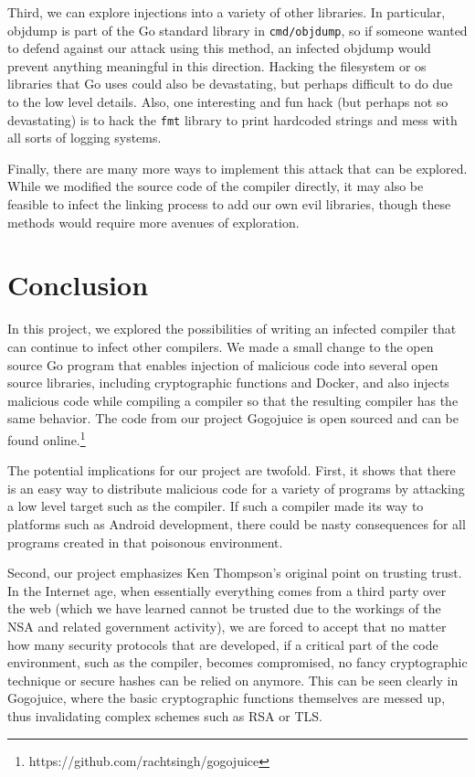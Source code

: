 \documentclass[10pt]{sigplanconf}
\begin{document}
\smallskip

Third, we can explore injections into a variety of other libraries. In particular, objdump is part of the Go standard library in \texttt{cmd/objdump}, so if someone wanted to defend against our attack using this method, an infected objdump would prevent anything meaningful in this direction. Hacking the filesystem or os libraries that Go uses could also be devastating, but perhaps difficult to do due to the low level details. Also, one interesting and fun hack (but perhaps not so devastating) is to hack the \texttt{fmt} library to print hardcoded strings and mess with all sorts of logging systems.

\smallskip

Finally, there are many more ways to implement this attack that can be explored. While we modified the source code of the compiler directly, it may also be feasible to infect the linking process to add our own evil libraries, though these methods would require more avenues of exploration.

\section{Conclusion}

In this project, we explored the possibilities of writing an infected compiler that can continue to infect other compilers. We made a small change to the open source Go program that enables injection of malicious code into several open source libraries, including cryptographic functions and Docker, and also injects malicious code while compiling a compiler so that the resulting compiler has the same behavior. The code from our project Gogojuice is open sourced and can be found online.\footnote{https://github.com/rachtsingh/gogojuice}

\smallskip

The potential implications for our project are twofold. First, it shows that there is an easy way to distribute malicious code for a variety of programs by attacking a low level target such as the compiler. If such a compiler made its way to platforms such as Android development, there could be nasty consequences for all programs created in that poisonous environment.

\smallskip
Second, our project emphasizes Ken Thompson's original point on trusting trust. In the Internet age, when essentially everything comes from a third party over the web (which we have learned cannot be trusted due to the workings of the NSA and related government activity), we are forced to accept that no matter how many security protocols that are developed, if a critical part of the code environment, such as the compiler, becomes compromised, no fancy cryptographic technique or secure hashes can be relied on anymore. This can be seen clearly in Gogojuice, where the basic cryptographic functions themselves are messed up, thus invalidating complex schemes such as RSA or TLS.
\end{document}

